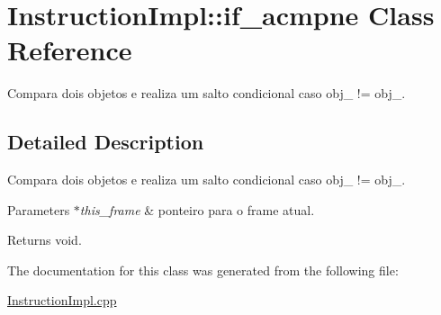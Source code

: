 \hypertarget{class_instruction_impl_1_1if__acmpne}{}\section{Instruction\+Impl\+:\+:if\+\_\+acmpne Class Reference}
\label{class_instruction_impl_1_1if__acmpne}


Compara dois objetos e realiza um salto condicional caso obj\+\_ != obj\+\_.  




\subsection{Detailed Description}
Compara dois objetos e realiza um salto condicional caso obj\+\_ != obj\+\_. 


\begin{DoxyParams}{Parameters}
{\em $\ast$this\+\_\+frame} & ponteiro para o frame atual. \\
\hline
\end{DoxyParams}
\begin{DoxyReturn}{Returns}
void. 
\end{DoxyReturn}


The documentation for this class was generated from the following file\+:\begin{DoxyCompactItemize}
\item 
\hyperlink{_instruction_impl_8cpp}{Instruction\+Impl.\+cpp}\end{DoxyCompactItemize}
